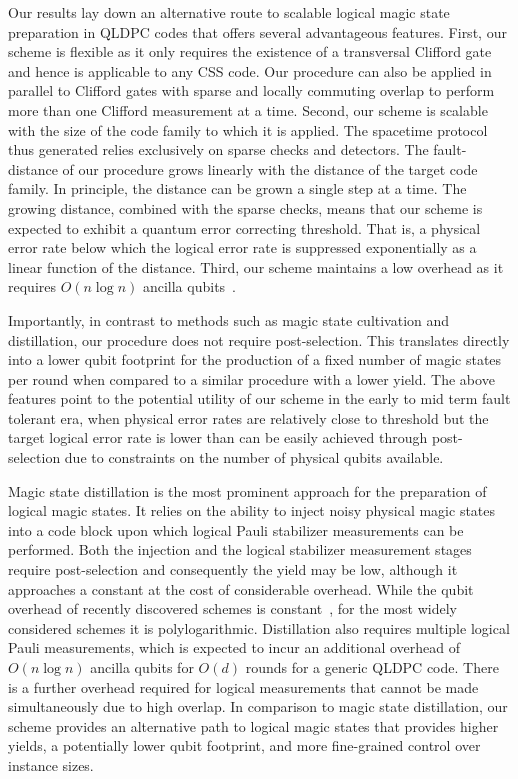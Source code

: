 \documentclass[11pt]{article}
\begin{document}
Our results lay down an alternative route to scalable logical magic state preparation in QLDPC codes that offers several advantageous features. First, our scheme is flexible as it only requires the existence of a transversal Clifford gate and hence is applicable to any CSS code. 
Our procedure can also be applied in parallel to Clifford gates with sparse and locally commuting overlap to perform more than one Clifford measurement at a time. 
Second, our scheme is scalable with the size of the code family to which it is applied. The spacetime protocol thus generated relies exclusively on sparse checks and detectors. The fault-distance of our procedure grows linearly with the distance of the target code family. In principle, the distance can be grown a single step at a time. 
The growing distance, combined with the sparse checks, means that our scheme is expected to exhibit a quantum error correcting threshold. That is, a physical error rate below which the logical error rate is suppressed exponentially as a linear function of the distance. Third, our scheme maintains a low overhead as it requires $O(n \log n)$ ancilla qubits~\cite{williamson2024lowoverheadfaulttolerantquantumcomputation,williamson2026fast, yuan2026parsimonious}.


Importantly, in contrast to methods such as magic state cultivation and distillation,  our procedure does not require post-selection. 
This translates directly into a lower qubit footprint for the production of a fixed number of magic states per round when compared to a similar procedure with a lower yield. The above features point to the potential utility of our scheme in the early to mid term fault tolerant era, when physical error rates are relatively close to threshold but the target logical error rate is lower than can be easily achieved through post-selection due to constraints on the number of physical qubits available. 

Magic state distillation is the most prominent approach for the preparation of logical magic states. It relies on the ability to inject noisy physical magic states into a code block upon which logical Pauli stabilizer measurements can be performed. Both the injection and the logical stabilizer measurement stages require post-selection and consequently the yield may be low, although it approaches a constant at the cost of considerable overhead. While the qubit overhead of recently discovered schemes is constant~\cite{wills2024constantoverheadmagicstatedistillation}, for the most widely considered schemes it is polylogarithmic. Distillation also requires multiple logical Pauli measurements, which is expected to incur an additional overhead of $O(n \log n)$ ancilla qubits for $O(d)$ rounds for a generic QLDPC code. There is a further overhead required for logical measurements that cannot be made simultaneously due to high overlap. In comparison to magic state distillation, our scheme provides an alternative path to logical magic states that provides higher yields, a potentially lower qubit footprint, and more fine-grained control over instance sizes. 
\end{document}
